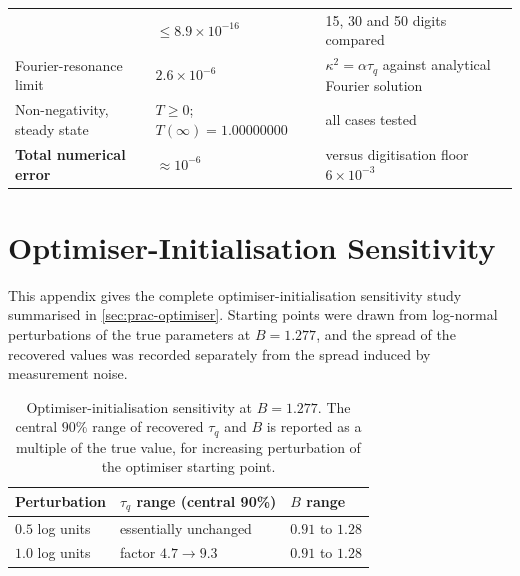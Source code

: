 \documentclass[preprint,12pt,a4paper]{elsarticle}
\theoremstyle{plain}
\theoremstyle{definition}
\theoremstyle{remark}
\newcommand{\tq}{\tau_{q}}
\newcommand{\kk}{\kappa^{2}}
\newcommand{\Bnum}{B}
\begin{document}
\begin{table}[htbp]
\begin{tabularx}{\textwidth}{@{}p{4.3cm}p{3.5cm}X@{}}
      & $\leq 8.9\times10^{-16}$
      & 15, 30 and 50 digits compared \\
    \addlinespace
    Fourier-resonance limit
      & $2.6\times10^{-6}$
      & $\kk=\alpha\tq$ against analytical Fourier solution \\
    \addlinespace
    Non-negativity, steady state
      & $T \geq 0$; $T(\infty)=1.00000000$
      & all cases tested \\
    \addlinespace
    \textbf{Total numerical error}
      & $\approx 10^{-6}$
      & versus digitisation floor $6\times10^{-3}$ \\
    \bottomrule
  \end{tabularx}
\end{table}


\clearpage
\section{Optimiser-Initialisation Sensitivity}
\label{app:optimiser}

This appendix gives the complete optimiser-initialisation sensitivity study
summarised in \cref{sec:prac-optimiser}. Starting points were drawn from
log-normal perturbations of the true parameters at $\Bnum=1.277$, and the
spread of the recovered values was recorded separately from the spread
induced by measurement noise.

\begin{table}[htbp]
  \centering
  \caption{Optimiser-initialisation sensitivity at $\Bnum=1.277$. The central
           $90\%$ range of recovered $\tq$ and $\Bnum$ is reported as a
           multiple of the true value, for increasing perturbation of the
           optimiser starting point.}
  \label{tab:optimiser}
  \begin{tabular}{@{}lll@{}}
    \toprule
    \textbf{Perturbation} & \textbf{$\tq$ range (central 90\%)} & \textbf{$\Bnum$ range} \\
    \midrule
    $0.5$ log units & essentially unchanged & $0.91$ to $1.28$ \\
    $1.0$ log units & factor $4.7 \to 9.3$ & $0.91$ to $1.28$ \\
    \bottomrule
  \end{tabular}
\end{table}
\end{document}
